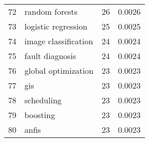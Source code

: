 \begin{tabular}{llrr}
72 &                   random forests &          26 &      0.0026 \\
73 &              logistic regression &          25 &      0.0025 \\
74 &             image classification &          24 &      0.0024 \\
75 &                  fault diagnosis &          24 &      0.0024 \\
76 &              global optimization &          23 &      0.0023 \\
77 &                              gis &          23 &      0.0023 \\
78 &                       scheduling &          23 &      0.0023 \\
79 &                         boosting &          23 &      0.0023 \\
80 &                            anfis &          23 &      0.0023 \\
\bottomrule
\end{tabular}
